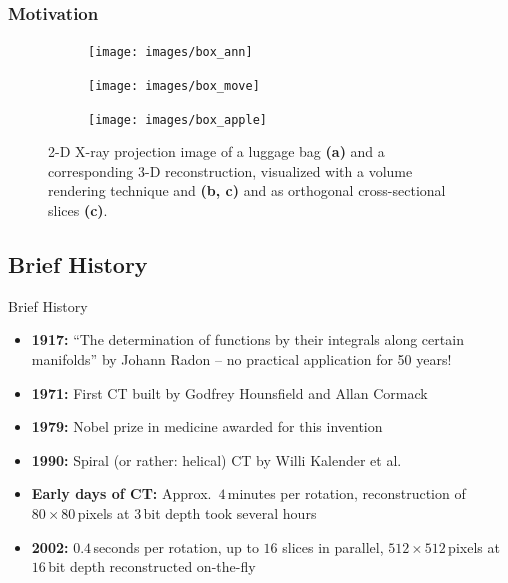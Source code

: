 \begin{frame}
	\frametitle{Motivation}
	\begin{figure}[tb]
		\centering
		\begin{subfigure}[t]{0.375\linewidth}
			\texttt{[image: images/box\_ann]}
			\caption{}
			\label{fig:ct_mot_1.1}
		\end{subfigure}
		\begin{subfigure}[t]{0.29\linewidth}
			\texttt{[image: images/box\_move]}
			\caption{}
			\label{fig:ct_mot_1.2}
		\end{subfigure}
		\begin{subfigure}[t]{0.29\linewidth}
			\texttt{[image: images/box\_apple]}
			\caption{}
			\label{fig:ct_mot_1.3}
		\end{subfigure}
		\caption{2-D X-ray projection image of a luggage bag \textbf{(a)} and a corresponding 3-D reconstruction, visualized with a volume rendering technique and \textbf{(b, c)} and as orthogonal cross-sectional slices \textbf{(c)}.}
		\label{fig:ct_mot_1}
	\end{figure}

\end{frame}


\subsection{Brief History}
\label{sub:ct_hist}

\begin{frame}{Brief History}

	\begin{itemize}
		\setlength\itemsep{0.3cm}
		\item \textcolor{faublue}{\textbf{1917:}} ``The determination of functions by their integrals along certain manifolds'' by Johann Radon -- no practical application for 50 years!
		\item \textcolor{faublue}{\textbf{1971:}} First CT built by Godfrey Hounsfield and Allan Cormack
		\item \textcolor{faublue}{\textbf{1979:}} Nobel prize in medicine awarded for this invention
		\item \textcolor{faublue}{\textbf{1990:}} Spiral (or rather: helical) CT by Willi Kalender et al.
		\item \textcolor{faublue}{\textbf{Early days of CT:}}\newline{} Approx.~$4$\,minutes per rotation, reconstruction of $80\times80$\,pixels at $3$\,bit depth took several hours
		\item \textcolor{faublue}{\textbf{2002:}} $0.4$\,seconds per rotation, up to $16$ slices in parallel, $512\times512$\,pixels at $16$\,bit depth reconstructed on-the-fly

	\end{itemize}

\end{frame}

